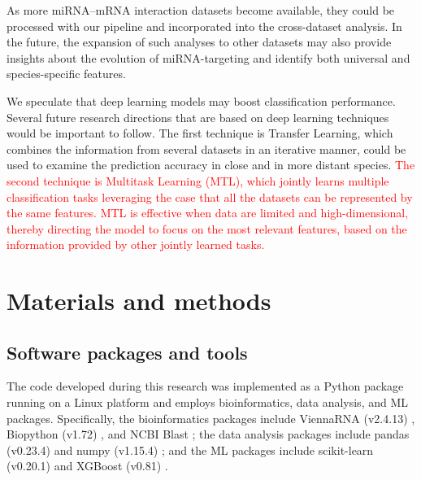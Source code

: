 \documentclass{bmcart}
\begin{document}
As more miRNA--mRNA interaction datasets become available, they could be processed with our pipeline and incorporated into the cross-dataset analysis. In the future, the expansion of such analyses to other datasets may also provide insights about the evolution of miRNA-targeting and identify both universal and species-specific features. 

We speculate that deep learning models may boost classification performance. Several future research directions that are based on deep learning techniques would be important to follow. The first technique is Transfer Learning, which combines the information from several datasets in an iterative manner, could be used to examine the prediction accuracy in close and in more distant species. \textcolor{red}{The second technique is Multitask Learning (MTL), which jointly learns multiple classification tasks leveraging the case that all the datasets can be represented by the same features. MTL is effective when data are limited and high-dimensional, thereby directing the model to focus on the most relevant features, based on the information provided by other jointly learned tasks.}





\clearpage
\section*{Materials and methods}
\subsection*{Software packages and tools}
The code developed during this research was implemented as a Python package running on a Linux platform and employs bioinformatics, data analysis, and ML packages. Specifically, the bioinformatics packages include ViennaRNA (v2.4.13) \cite{lorenz2011viennarna}, Biopython (v1.72) \cite{cock2009biopython}, and NCBI Blast \cite{altschul1990basic_blast}; the data analysis packages include pandas (v0.23.4) \cite{mckinney2010data_pandas} and numpy (v1.15.4) \cite{oliphant2006guide_numpy}; and the ML packages include scikit-learn (v0.20.1) \cite{pedregosa2011scikit} and XGBoost (v0.81) \cite{xgboost}.
\end{document}
